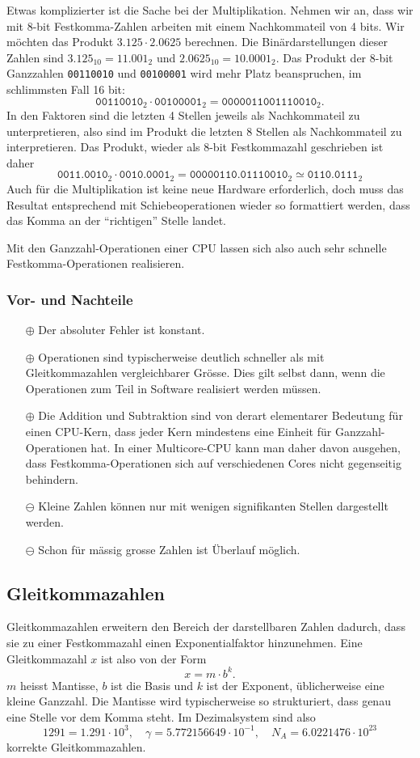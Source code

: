 Etwas komplizierter ist die Sache bei der Multiplikation.
Nehmen wir an, dass wir mit 8-bit Festkomma-Zahlen arbeiten mit
einem Nachkommateil von 4 bits. 
Wir möchten das Produkt $3.125\cdot 2.0625$ berechnen.
Die Binärdarstellungen dieser Zahlen sind
$3.125_{10}=11.001_{2}$ und $2.0625_{10}= 10.0001_{2}$.
Das Produkt der 8-bit Ganzzahlen \texttt{00110010} und \texttt{00100001}
wird mehr Platz beanspruchen, im schlimmsten Fall 16 bit:
\[
\texttt{00110010}_2\cdot\texttt{00100001}_2
=
\texttt{0000011001110010}_2.
\]
In den Faktoren sind die letzten 4 Stellen jeweils als Nachkommateil
zu unterpretieren, also sind im Produkt die letzten 8 Stellen als
Nachkommateil zu interpretieren.
Das Produkt, wieder als 8-bit Festkommazahl geschrieben ist daher
\[
\texttt{0011.0010}_2\cdot\texttt{0010.0001}_2
=
\texttt{00000110.01110010}_2
\simeq
\texttt{0110.0111}_2
\]
Auch für die Multiplikation ist keine neue Hardware erforderlich,
doch muss das Resultat entsprechend mit Schiebeoperationen wieder
so formattiert werden, dass das Komma an der ``richtigen'' Stelle
landet.

Mit den Ganzzahl-Operationen einer CPU lassen sich also auch sehr
schnelle Festkomma-Operationen realisieren.

\subsubsection{Vor- und Nachteile}
\begin{itemize}
\item[$\oplus$]  Der absoluter Fehler ist konstant.
\item[$\oplus$]  Operationen sind typischerweise deutlich schneller als
mit Gleitkommazahlen vergleichbarer Grösse.
Dies gilt selbst dann, wenn die Operationen zum Teil in Software 
realisiert werden müssen.
\item[$\oplus$] Die Addition und Subtraktion sind von derart elementarer
Bedeutung für einen CPU-Kern, dass jeder Kern mindestens eine Einheit
für Ganzzahl-Operationen hat.
In einer Multicore-CPU kann man daher davon ausgehen, dass Festkomma-Operationen
sich auf verschiedenen Cores nicht gegenseitig behindern.
\item[$\ominus$] Kleine Zahlen können nur mit wenigen signifikanten
Stellen dargestellt werden.
\item[$\ominus$] Schon für mässig grosse Zahlen ist Überlauf möglich.
\end{itemize}

\subsection{Gleitkommazahlen
\label{buch:subsection:floatinpoing}}
Gleitkommazahlen erweitern den Bereich der darstellbaren Zahlen dadurch,
dass sie zu einer Festkommazahl einen Exponentialfaktor hinzunehmen.
Eine Gleitkommazahl $x$ ist also von der Form
\[
x = m \cdot b^k.
\]
$m$ heisst Mantisse, $b$ ist die Basis und $k$ ist der
Exponent, üblicherweise eine kleine Ganzzahl.
Die Mantisse wird typischerweise so strukturiert, dass genau eine 
Stelle vor dem Komma steht.
Im Dezimalsystem sind also
\[
1291
=
1.291\cdot 10^{3},
\quad
\gamma = 5.772156649\cdot 10^{-1},
\quad
N_A
=
6.0221476\cdot 10^{23}
\]
korrekte Gleitkommazahlen.

